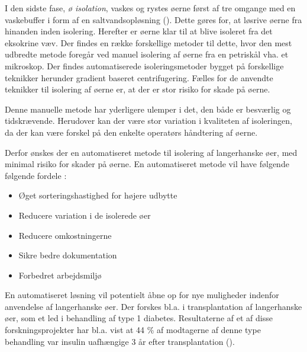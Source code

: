 I den sidste fase, \textit{ø isolation}, vaskes og rystes øerne først af tre omgange med en vaskebuffer i form af en saltvandsopløsning (\cite{hbbs}). Dette gøres for, at løsrive øerne fra hinanden inden isolering. Herefter er øerne klar til at blive isoleret fra det eksokrine væv. Der findes en række forskellige metoder til dette, hvor den mest udbredte metode foregår ved manuel isolering af øerne fra en petriskål vha. et mikroskop. Der findes automatiserede isoleringsmetoder bygget på forskellige teknikker herunder gradient baseret centrifugering. Fælles for de anvendte teknikker til isolering af øerne er, at der er stor risiko for skade på øerne. 

Denne manuelle metode har yderligere ulemper i det, den både er besværlig og tidskrævende. Herudover kan der være stor variation i kvaliteten af isoleringen, da der kan være forskel på den enkelte operatørs håndtering af øerne. 

Derfor ønskes der en automatiseret metode til isolering af langerhanske øer, med minimal risiko for skader på øerne. En automatiseret metode vil have følgende følgende fordele \cite{pptintro}: 

\begin{itemize}
\item Øget sorteringshastighed for højere udbytte
\item Reducere variation i de isolerede øer
\item Reducere omkostningerne
\item Sikre bedre dokumentation
\item Forbedret arbejdsmiljø
\end{itemize} 

En automatiseret løsning vil potentielt åbne op for nye muligheder indenfor anvendelse af langerhanske øer. Der forskes bl.a. i transplantation af langerhanske øer, som et led i behandling af type 1 diabetes. Resultaterne af et af disse forskningsprojekter har bl.a. vist at 44 \% af modtagerne af denne type behandling var insulin uafhængige 3 år efter transplantation (\cite{islettransplantation}).


 

%
%
%
% 
% 
% 
% 
% 

